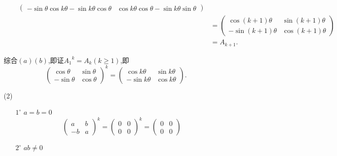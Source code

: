 \documentclass{article}
\begin{document}
\begin{enumerate}
\begin{enumerate}
\begin{enumerate}
\begin{align*}
\begin{pmatrix}
                        -\sin\theta\cos k\theta-\sin k\theta\cos\theta&\cos k\theta\cos\theta-\sin k\theta\sin\theta
                    \end{pmatrix}\\
                    &=
                    \begin{pmatrix}
                        \cos (k+1)\theta&\sin (k+1)\theta\\
                        -\sin (k+1)\theta&\cos (k+1)\theta
                    \end{pmatrix}\\
                    &=A_{k+1}.
                \end{align*}
            \end{enumerate}
            综合$(a)(b)$,即证${A_1}^{k}=A_k(k\geqslant 1)$,即
            \[
                {\begin{pmatrix}
                    \cos \theta&\sin \theta\\
                    -\sin \theta&\cos \theta
                \end{pmatrix}}^{k}
                =
                \begin{pmatrix}
                \cos k\theta&\sin k\theta\\
                -\sin k\theta&\cos k\theta
                \end{pmatrix}.
            \]
            \item [(2)]
            \begin{enumerate}
                \item [$1^\circ$]$a=b=0$
                \[
                    {\begin{pmatrix}
                        a& b\\
                        -b& a    
                    \end{pmatrix}}^{k}
                    =
                    {\begin{pmatrix}
                        0& 0\\
                        0& 0
                    \end{pmatrix}}^{k}
                    =
                    \begin{pmatrix}
                        0& 0\\
                        0& 0
                    \end{pmatrix}
                \]
                \item [$2^\circ$]$ab\neq 0$
                \[
\]
\end{enumerate}
\end{enumerate}
\end{enumerate}
\end{document}
